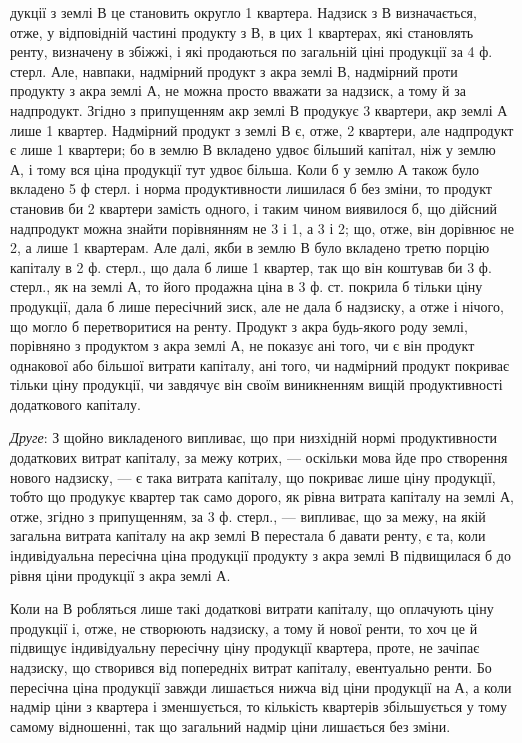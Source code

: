 \parcont{}  %
дукції з землі В це становить округло 1 квартера. Надзиск з В визначається,
отже, у відповідній частині продукту з В, в цих 1 квартерах, які
становлять ренту, визначену в збіжжі, і які продаються по загальній ціні продукції
за 4 ф. стерл. Але, навпаки, надмірний продукт з акра землі В, надмірний
проти продукту з акра землі А, не можна просто вважати за надзиск,
а тому й за надпродукт. Згідно з припущенням акр землі В продукує 3 квартери,
акр землі А лише 1 квартер. Надмірний продукт з землі В є, отже,
2 квартери, але надпродукт є лише 1 квартери; бо в землю
В вкладено удвоє більший капітал, ніж у землю А, і тому вся ціна продукції тут удвоє
більша. Коли б у землю А також було вкладено 5 ф стерл. і норма продуктивности
лишилася б без зміни, то продукт становив би 2 квартери замість одного,
і таким чином виявилося б, що дійсний надпродукт можна знайти порівнянням
не 3 і 1, а 3 і 2; що, отже, він дорівнює не 2,
а лише 1 квартерам.
Але далі, якби в землю В було вкладено третю порцію капіталу в 2 ф. стерл.,
що дала б лише 1 квартер, так що він коштував би 3 ф. стерл., як на землі А, то
його продажна ціна в 3 ф. ст. покрила б тільки ціну продукції, дала б лише
пересічний зиск, але не дала б надзиску, а отже і нічого, що могло б перетворитися
на ренту. Продукт з акра будь-якого роду землі, порівняно з продуктом
з акра землі А, не показує ані того, чи є він продукт однакової або більшої
витрати капіталу, ані того, чи надмірний продукт покриває тільки ціну продукції,
чи завдячує він своїм виникненням вищій продуктивності додаткового капіталу.

\emph{Друге}: З щойно викладеного випливає, що при низхідній нормі продуктивности
додаткових витрат капіталу, за межу котрих, — оскільки мова йде
про створення нового надзиску, — є така витрата капіталу, що покриває лише
ціну продукції, тобто що продукує квартер так само дорого, як рівна витрата
капіталу на землі А, отже, згідно з припущенням, за 3 ф. стерл., — випливає,
що за межу, на якій загальна витрата капіталу на акр землі В перестала б
давати ренту, є та, коли індивідуальна пересічна ціна продукції продукту з
акра землі В підвищилася б до рівня ціни продукції з акра землі А.

Коли на В робляться лише такі додаткові витрати капіталу, що оплачують
ціну продукції і, отже, не створюють надзиску, а тому й нової ренти, то хоч
це й підвищує індивідуальну пересічну ціну продукції квартера, проте, не зачіпає
надзиску, що створився від попередніх витрат капіталу, евентуально ренти. Бо
пересічна ціна продукції завжди лишається нижча від ціни продукції на А, а коли
надмір ціни з квартера і зменшується, то кількість квартерів збільшується
у тому самому відношенні, так що загальний надмір ціни лишається без зміни.


